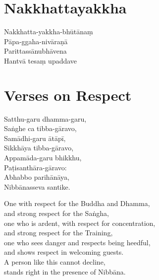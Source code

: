 \section{Nakkhattayakkha}



\bigskip

\begin{paritta}
  Nakkhatta-yakkha-bhūtānaṃ\\
  Pāpa-ggaha-nivāraṇā\\
  Parittassānubhāvena\\
  Hantvā tesaṃ upaddave
\end{paritta}


\section{Verses on Respect}



Satthu-garu dhamma-garu,\\
Saṅghe ca tibba-gāravo,\\
Samādhi-garu ātāpī,\\
Sikkhāya tibba-gāravo,\\
Appamāda-garu bhikkhu,\\
Paṭisanthāra-gāravo:\\
Abhabbo parihānāya,\\
Nibbānasseva santike.

\begin{english}
  One with respect for the Buddha and Dhamma,\\
  and strong respect for the Saṅgha,\\
  one who is ardent, with respect for concentration,\\
  and strong respect for the Training,\\
  one who sees danger and respects being heedful,\\
  and shows respect in welcoming guests.\\
  A person like this cannot decline,\\
  stands right in the presence of Nibbāna. 
\end{english}
